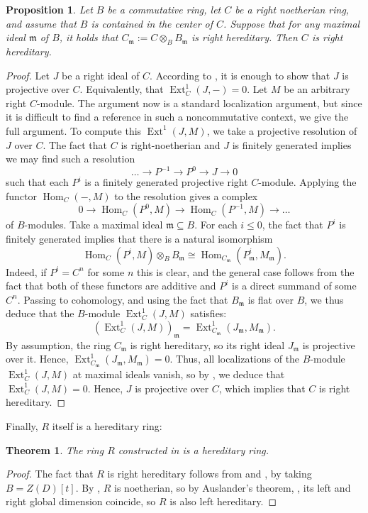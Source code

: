 \documentclass{amsart}
\newtheorem{thm}[equation]{Theorem}
\newtheorem{prop}[equation]{Proposition}
\theoremstyle{definition}
\newcommand{\opn}{\operatorname}
\newcommand{\mfrak}[1]{\mathfrak{#1}}
\newcommand{\m}{\mfrak{m}}
\numberwithin{equation}{section}
\begin{document}
\begin{prop}\label{prop:local-to-global-here}
Let $B$ be a commutative ring,
let $C$ be a right noetherian ring, and assume that $B$ is contained in the center of $C$.
Suppose that for any maximal ideal $\m$ of $B$,
it holds that $C_{\m} := C\otimes_B B_{\m}$ is right hereditary.
Then $C$ is right hereditary.
\end{prop}
\begin{proof}
Let $J$ be a right ideal of $C$.
According to \cite[Proposition 5.14]{Lam2},
it is enough to show that $J$ is projective over $C$. Equivalently, that $\opn{Ext}^1_C(J,-) = 0$.
Let $M$ be an arbitrary right $C$-module.
The argument now is a standard localization argument,
but since it is difficult to find a reference in such a noncommutative context, we give the full argument.
To compute this $\opn{Ext}^1(J,M)$,
we take a projective resolution of $J$ over $C$.
The fact that $C$ is right-noetherian and $J$ is finitely generated implies we may find such a resolution
\[
\dots \to P^{-1} \to P^0 \to J \to 0
\]
such that each $P^i$ is a finitely generated projective right $C$-module.
Applying the functor $\opn{Hom}_C(-,M)$ to the resolution gives a complex
\[
0 \to \opn{Hom}_C(P^0,M) \to \opn{Hom}_C(P^{-1},M) \to \dots
\]
of $B$-modules.
Take a maximal ideal $\m \subseteq B$.
For each $i \le 0$, the fact that $P^i$ is finitely generated implies that there is a natural isomorphism
\[
\opn{Hom}_C(P^i,M) \otimes_B B_{\m} \cong \opn{Hom}_{C_{\m}}(P^i_{\m},M_{\m}).
\]
Indeed, if $P^i = C^n$ for some $n$ this is clear,
and the general case follows from the fact that both of these functors are additive and $P^i$ is a direct summand of some $C^n$.
Passing to cohomology, and using the fact that $B_{\m}$ is flat over $B$,
we thus deduce that the $B$-module $\opn{Ext}^1_C(J,M)$ satisfies:
\[
\left(\opn{Ext}^1_C(J,M)\right)_{\m} = \opn{Ext}^1_{C_{\m}}(J_{\m},M_{\m}).
\]
By assumption, the ring $C_{\m}$ is right hereditary,
so its right ideal $J_{\m}$ is projective over it.
Hence, $\opn{Ext}^1_{C_{\m}}(J_{\m},M_{\m}) = 0$.
Thus, all localizations of the $B$-module $\opn{Ext}^1_C(J,M)$ at maximal ideals vanish, so by \cite[Proposition 3.8]{AM}, 
we deduce that $\opn{Ext}^1_C(J,M) = 0$.
Hence, $J$ is projective over $C$, which implies that $C$ is right hereditary.
\end{proof}

Finally, $R$ itself is a hereditary ring:
\begin{thm}\label{thm:here}
The ring $R$ constructed in  is a hereditary ring. 
\end{thm}
\begin{proof}
The fact that $R$ is right hereditary follows from  and ,
by taking $B = Z(D)[t]$.
By , $R$ is noetherian,
so by Auslander's theorem, \cite[Corollary 5]{Aus}, its left and right global dimension coincide,
so $R$ is also left hereditary.
\end{proof}
\end{document}
